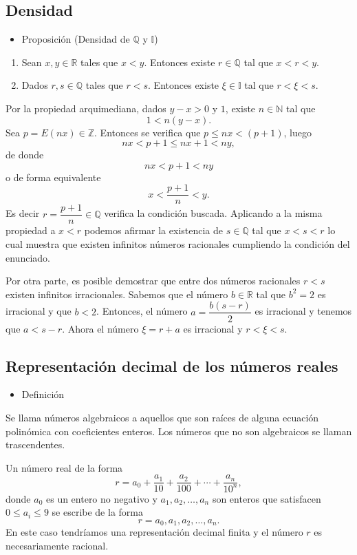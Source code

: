 \documentclass[12pt]{article}
\begin{document}
\subsection{Densidad}
\begin{itemize}[label=\color{red}\textbullet, leftmargin=*]
	\item \color{lightblue} Proposición (Densidad de $\mathbb{Q}$ y $\mathbb{I}$)
\end{itemize}
\begin{enumerate}[label=\arabic*)]
	\item Sean $x,y\in\mathbb{R}$ tales que $x<y$. Entonces existe $r\in\mathbb{Q}$ tal que $x<r<y$.
	\item Dados $r,s\in\mathbb{Q}$ tales que $r<s$. Entonces existe $\xi\in\mathbb{I}$ tal que $r<\xi<s$.
\end{enumerate}
Por la propiedad arquimediana, dados $y-x>0$ y $1$, existe $n\in\mathbb{N}$ tal que \[ 1<n(y-x) .\]
Sea $p=E(nx)\in\mathbb{Z}$. Entonces se verifica que $p\le nx<(p+1)$, luego \[ nx<p+1\le nx+1<ny ,\] de donde \[ nx<p+1<ny \] o de forma equivalente \[ x<\dfrac{p+1}{n} <y.\]
Es decir $r=\dfrac{p+1}{n}\in\mathbb{Q}$ verifica la condición buscada. Aplicando a la misma propiedad a $x<r$ podemos afirmar la existencia de $s\in\mathbb{Q}$ tal que $x<s<r$ lo cual muestra  que existen infinitos números racionales cumpliendo la condición del enunciado.

Por otra parte, es posible demostrar que entre dos números racionales $r<s$ existen infinitos irracionales. Sabemos que el número $b\in\mathbb{R}$ tal que $b^2=2$ es irracional y que $b<2$. Entonces, el número $a=\dfrac{b(s-r)}{2}$ es irracional y tenemos que $a<s-r$. Ahora el número $\xi=r+a$ es irracional y $r<\xi<s$.
\subsection{Representación decimal de los números reales}
\begin{itemize}[label=\color{red}\textbullet, leftmargin=*]
	\item \color{lightblue} Definición
\end{itemize}
Se llama números algebraicos a aquellos que son raíces de alguna ecuación polinómica con coeficientes enteros. Los números que no son algebraicos se llaman trascendentes.

Un número real de la forma \[ r=a_0+\dfrac{a_1}{10}+\dfrac{a_2}{100}+\cdots+\dfrac{a_n}{10^n} ,\] donde $a_0$ es un entero no negativo y $a_1,a_2,\hdots,a_n$ son enteros que satisfacen $0\le a_i\le 9$ se escribe de la forma \[ r=a_0,a_1,a_2,\hdots,a_n. \]
En este caso tendríamos una representación decimal finita y el número $r$ es necesariamente racional.
\end{document}
